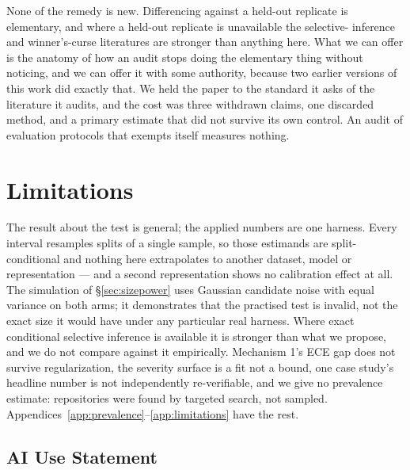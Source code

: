 \documentclass{article}
\begin{document}
None of the remedy is new. Differencing against a held-out replicate is
elementary, and where a held-out replicate is unavailable the selective-
inference and winner's-curse literatures are stronger than anything here.
What we can offer is the anatomy of how an audit stops doing the elementary
thing without noticing, and we can offer it with some authority, because two
earlier versions of this work did exactly that. We held the paper to the
standard it asks of the literature it audits, and the cost was three
withdrawn claims, one discarded method, and a primary estimate that did not
survive its own control. An audit of evaluation protocols that exempts itself
measures nothing.

\section*{Limitations}

The result about the test is general; the applied numbers are one harness.
Every interval resamples splits of a single sample, so those estimands are
split-conditional and nothing here extrapolates to another dataset, model or
representation --- and a second representation shows no calibration effect at
all. The simulation of \S\ref{sec:sizepower} uses Gaussian candidate noise
with equal variance on both arms; it demonstrates that the practised test is
invalid, not the exact size it would have under any particular real harness.
Where exact conditional selective inference is available it is stronger than
what we propose, and we do not compare against it empirically. Mechanism 1's
ECE gap does not survive regularization, the severity surface is a fit not a
bound, one case study's headline number is not independently re-verifiable,
and we give no prevalence estimate: repositories were found by targeted
search, not sampled.
Appendices~\ref{app:prevalence}--\ref{app:limitations} have the rest.

\subsection*{AI Use Statement}
\end{document}
